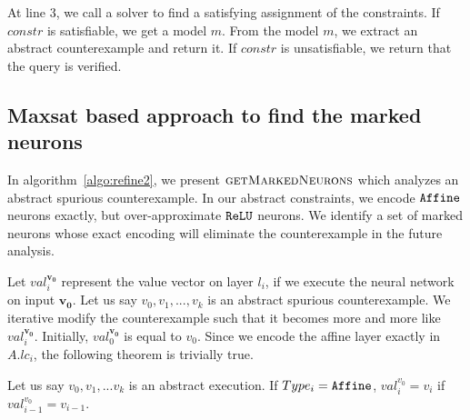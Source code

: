 At line 3, we call a solver to find a satisfying assignment of the constraints.
If $constr$ is satisfiable, we get a model $m$.
From the model $m$, we extract an abstract counterexample and return it.
If $constr$ is unsatisfiable, we return that the query is verified.




\subsection{Maxsat based approach to find the marked neurons}

In algorithm~\ref{algo:refine2}, we present $\textsc{getMarkedNeurons}$
which analyzes an abstract spurious counterexample.
In our abstract constraints, we encode $\texttt{Affine}${} neurons exactly, but
over-approximate $\texttt{ReLU}${} neurons.
We identify a set of
marked neurons whose exact encoding will eliminate the counterexample
in the future analysis.
%

Let ${val_i^{\boldsymbol{v_0}}}$ represent the value vector on layer $l_i$, 
if we execute the neural network on input $\boldsymbol{v_0}$.
%
Let us say ${v_0}, {v_1}, ... ,{v_k}$ is an abstract spurious counterexample.
We iterative modify the counterexample such that it becomes more and more
like ${val_i^{\boldsymbol{v_0}}}$.
Initially, ${val_0^{\boldsymbol{v_0}}}$ is equal to $v_0$.
Since we encode the affine layer exactly in $A.lc_i$, the following
theorem is trivially true.


\begin{theorem}
  \label{th:marked2}
  Let us say ${v_0}, {v_1}, ... {v_k}$ is an abstract execution. 
  If $Type_i = \texttt{Affine}$, ${val_i^{{v_0}}} = {v_i}$ if ${val_{i-1}^{{v_0}}} = {v_{i-1}}$.  
\end{theorem}

